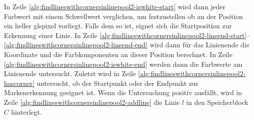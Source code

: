 In Zeile \ref{alg:findlineswithcornersinlinepool2-iswhite-start} wird dann jeder Farbwert mit einem Schwellwert
 verglichen, um festzustellen ob an der Position ein heller gls{pixel} vorliegt. Falls dem so ist, eignet sich die
 Startposition zur Erkennung einer Linie. In Zeile
 \ref{alg:findlineswithcornersinlinepool2-lineend-start}--\ref{alg:findlineswithcornersinlinepool2-lineend-end} wird
 dann für das Linienende die Koordinate und die Farbkomponenten an dieser Position berechnet. In Zeile
 \ref{alg:findlineswithcornersinlinepool2-iswhite-end} werden dann die Farbwerte am Linienende untersucht. Zuletzt wird
 in Zeile \ref{alg:findlineswithcornersinlinepool2-hascorner} untersucht, ob der Startpunkt oder der Endpunkt zur
 Markenerkennung geeignet ist. Wenn die Untersuchung positiv ausfällt, wird in Zeile
 \ref{alg:findlineswithcornersinlinepool2-addline} die Linie $l$ in den Speicherblock $C$ hinterlegt.
